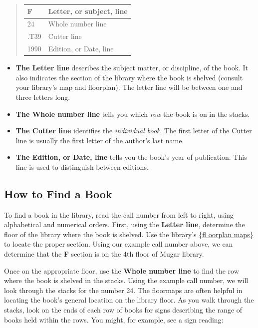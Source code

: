 {\begin{quote}
\hspace{.4in}\begin{tabular}{ |l|l| }
  \hline
  F & Letter, or subject, line \\ \hline
  24 & Whole number line \\
  \hline
  .T39 & Cutter line \\ \hline
  1990 & Edition, or Date, line\\ \hline
\end{tabular}
\end{quote}

\begin{itemize}
\item \textbf{The Letter line} describes the subject matter, or discipline, of 
the book. It also indicates the section of the library where the book is 
shelved (consult your library's map and floorplan). The letter line will be 
between one and three letters long.
\item \textbf{The Whole number line} tells you which \emph{row} the book is on 
in the stacks. 
\item \textbf{The Cutter line} identifies the \emph{individual book}. The first 
letter of the Cutter line is usually the first letter of the author's last name.
\item \textbf{The Edition, or Date, line} tells you the book's year of 
publication. This line is used to distinguish between editions.
\end{itemize}

\subsection{How to Find a Book}
To find a book in the library, read the call number from left to right, using 
alphabetical and numerical orders. First, using the \textbf{Letter line}, 
determine the floor of the library where the book is shelved. Use the library's 
\href{http://www.bu.edu/library/mugar-memorial/about/floorplans/#f=floor-1}{\{fl
oorplan maps\}} to locate the proper section. Using our example call number 
above, we can determine that the \textbf{F} section is on the 4th floor of 
Mugar library. 

Once on the appropriate floor, use the \textbf{Whole number line} to find the 
row where the book is shelved in the stacks. Using the example call number, we 
will look through the stacks for the number 24. The floormaps are often helpful 
in locating the book's general location on the library floor. As you walk 
through the stacks, look on the ends of each row of books for signs describing 
the range of books held within the rows. You might, for example, see a sign 
reading:

}

